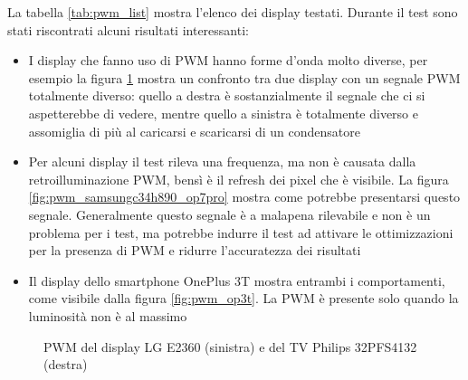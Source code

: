 La tabella \ref{tab:pwm_list} mostra l'elenco dei display testati. Durante il test sono stati riscontrati alcuni risultati interessanti:\begin{itemize}
	\item I display che fanno uso di PWM hanno forme d'onda molto diverse, per esempio la figura \ref{fig:pwm_lge2360_philips32pfs4132} mostra un confronto tra due display con un segnale PWM totalmente diverso: quello a destra è sostanzialmente il segnale che ci si aspetterebbe di vedere, mentre quello a sinistra è totalmente diverso e assomiglia di più al caricarsi e scaricarsi di un condensatore
	\item Per alcuni display il test rileva una frequenza, ma non è causata dalla retroilluminazione PWM, bensì è il refresh dei pixel che è visibile. La figura \ref{fig:pwm_samsungc34h890_op7pro} mostra come potrebbe presentarsi questo segnale. Generalmente questo segnale è a malapena rilevabile e non è un problema per i test, ma potrebbe indurre il test ad attivare le ottimizzazioni per la presenza di PWM e ridurre l'accuratezza dei risultati
	\item Il display dello smartphone OnePlus 3T mostra entrambi i comportamenti, come visibile dalla figura \ref{fig:pwm_op3t}. La PWM è presente solo quando la luminosità non è al massimo
\end{itemize}

\begin{figure}[h!]
	\centering
	\caption{PWM del display LG E2360 (sinistra) e del TV Philips 32PFS4132 (destra)}
	\label{fig:pwm_lge2360_philips32pfs4132}
\end{figure}

